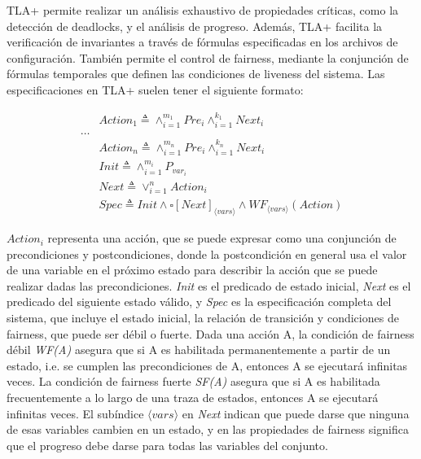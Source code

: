 \documentclass[runningheads]{llncs}
\begin{document}
TLA+ permite realizar un análisis exhaustivo de propiedades críticas, como la detección de deadlocks, y el análisis de progreso. Además, TLA+ facilita la verificación de invariantes a través de fórmulas especificadas en los archivos de configuración. También permite el control de fairness, mediante la conjunción de fórmulas temporales que definen las condiciones de liveness del sistema. Las especificaciones en TLA+ suelen tener el siguiente formato:
%
\begin{figure}
\begin{footnotesize}
\[
\begin{aligned}
    & Action_1 \triangleq \land_{i=1}^{m_1} Pre_i \land_{i=1}^{k_1} Next_i \\
    \dots \\
    & Action_n \triangleq \land_{i=1}^{m_n} Pre_i \land_{i=1}^{k_n} Next_i \\
    & Init \triangleq \land_{i=1}^{m_i} P_{var_i} \\
    & Next \triangleq \lor_{i=1}^{n} Action_i \\
    & Spec \triangleq Init \land \square [Next]_{\langle vars \rangle} \land WF_{\langle vars \rangle}(Action)
\end{aligned}
\]
\end{footnotesize}
\end{figure}
%
$Action_{i}$ representa una acción, que se puede expresar como una conjunción de precondiciones y postcondiciones, donde la postcondición en general usa el valor de una variable en el próximo estado para describir la acción que se puede realizar dadas las precondiciones. \textit{Init} es el predicado de estado inicial, \textit{Next} es el predicado del siguiente estado válido, y \textit{Spec} es la especificación completa del sistema, que incluye el estado inicial, la relación de transición y condiciones de fairness, que puede ser débil o fuerte. Dada una acción A, la condición de fairness débil \textit{WF(A)} asegura que si A es habilitada permanentemente a partir de un estado, i.e. se cumplen las precondiciones de A, entonces A se ejecutará infinitas veces. La condición de fairness fuerte \textit{SF(A)} asegura que si A es habilitada frecuentemente a lo largo de una traza de estados, entonces A se ejecutará infinitas veces. El subíndice $\langle vars \rangle$ en \textit{Next} indican que puede darse que ninguna de esas variables cambien en un estado, y en las propiedades de fairness significa que el progreso debe darse para todas las variables del conjunto. 
\end{document}
